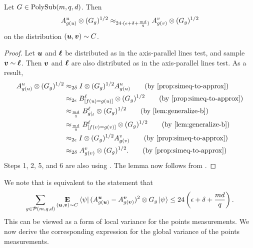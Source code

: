 \begin{lemma}\label{lem:local-variance-of-points}
Let $G \in \mathrm{PolySub}(m, q, d)$.  Then
\begin{equation}\label{eq:local-variance-of-points-equation}
A^u_{g(u)} \otimes (G_g)^{1/2} \approx_{24\cdot(\epsilon + \delta + \frac{md}{q})} A^v_{g(v)} \otimes (G_g)^{1/2}
\end{equation}
on the distribution $(\boldsymbol{u}, \boldsymbol{v}) \sim C$.
\end{lemma}
\begin{proof}
Let $\boldsymbol{u}$ and $\boldsymbol{\ell}$ be distributed as in the axis-parallel lines test,
and sample $\boldsymbol{v} \sim \boldsymbol{\ell}$.
Then $\boldsymbol{v}$ and $\boldsymbol{\ell}$ are also distributed as in the axis-parallel lines test.
As a result,
\begin{align*}
A^u_{g(u)} \otimes (G_g)^{1/2}
&\approx_{2\delta} I \otimes (G_g)^{1/2} A^u_{g(u)}\tag{by \Cref{prop:simeq-to-approx}}\\
&\approx_{2\eps} B^\ell_{[f(u) = g(u)]} \otimes (G_g)^{1/2}\tag{by \Cref{prop:simeq-to-approx}}\\
&\approx_{\frac{md}{q}} B^\ell_{g|_{\ell}} \otimes (G_g)^{1/2}\tag{by \Cref{lem:generalize-b}}\\
&\approx_{\frac{md}{q}} B^\ell_{[f(v) = g(v)]} \otimes (G_g)^{1/2}\tag{by \Cref{lem:generalize-b}}\\
&\approx_{2\eps} I \otimes (G_g)^{1/2} A^v_{g(v)} \tag{by \Cref{prop:simeq-to-approx}}\\
&\approx_{2\delta} A^v_{g(v)} \otimes (G_g)^{1/2}.\tag{by \Cref{prop:simeq-to-approx}}
\end{align*}
Steps 1, 2, 5, and 6 are also using .
The lemma now follows from .
\end{proof}

We note that  is equivalent to the statement that
\begin{equation}\label{eq:equivalent-local-variance}
\sum_{g \in \mathcal{P}(m, q, d)}\mathop{\bf E\/}_{(\boldsymbol{u}, \boldsymbol{v}) \sim C} \bra{\psi} (A^{\boldsymbol{u}}_{g(\boldsymbol{u})}  - A^{\boldsymbol{v}}_{g(\boldsymbol{v})})^2 \otimes G_g \ket{\psi}
\leq 24\left(\epsilon + \delta + \frac{md}{q}\right).
\end{equation}
This can be viewed as a form of local variance for the points measurements.
We now derive the corresponding expression for the global variance of the points measurements.

